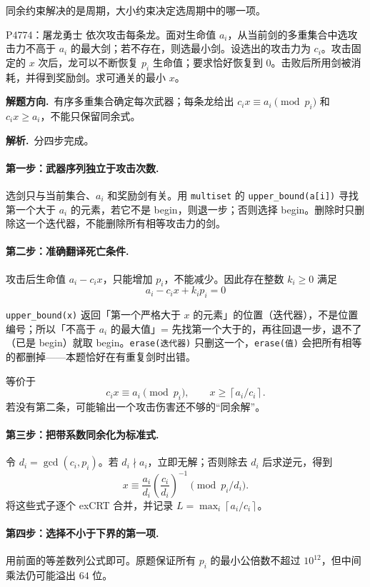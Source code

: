\documentclass[UTF8,a4paper,11pt,oneside,openany,fontset=fandol]{ctexbook}
\theoremstyle{definition}
\newcommand{\ceil}[1]{\left\lceil #1\right\rceil}
\newcommand{\sol}{\par\noindent\textbf{解析.}\ }
\newcommand{\hint}{\par\noindent\textbf{解题方向.}\ }
\begin{document}
同余约束解决的是周期，大小约束决定选周期中的哪一项。


\begin{problem}{P4774：屠龙勇士}
依次攻击每条龙。面对生命值 $a_i$，从当前剑的多重集合中选攻击力不高于 $a_i$ 的最大剑；若不存在，则选最小剑。设选出的攻击力为 $c_i$。攻击固定的 $x$ 次后，龙可以不断恢复 $p_i$ 生命值；要求恰好恢复到 $0$。击败后所用剑被消耗，并得到奖励剑。求可通关的最小 $x$。
\end{problem}
\hint 有序多重集合确定每次武器；每条龙给出 $c_ix\equiv a_i\pmod{p_i}$ 和 $c_ix\ge a_i$，不能只保留同余式。

\sol 分四步完成。
\paragraph{第一步：武器序列独立于攻击次数.}
选剑只与当前集合、$a_i$ 和奖励剑有关。用 \texttt{multiset} 的 \texttt{upper\_bound(a[i])} 寻找第一个大于 $a_i$ 的元素，若它不是 begin，则退一步；否则选择 begin。删除时只删除这一个迭代器，不能删除所有相等攻击力的剑。

\paragraph{第二步：准确翻译死亡条件.}
攻击后生命值 $a_i-c_ix$，只能增加 $p_i$，不能减少。因此存在整数 $k_i\ge0$ 满足
\[
 a_i-c_ix+k_ip_i=0
\]

\begin{tip}[两个容器术语]
\texttt{upper\_bound(x)} 返回「第一个严格大于 $x$ 的元素」的位置（迭代器），不是位置编号；所以「不高于 $a_i$ 的最大值」= 先找第一个大于的，再往回退一步，退不了（已是 begin）就取 begin。\texttt{erase(迭代器)} 只删这一个，\texttt{erase(值)} 会把所有相等的都删掉——本题恰好在有重复剑时出错。
\end{tip}

等价于
\[
 c_ix\equiv a_i\pmod{p_i},\qquad x\ge\ceil{a_i/c_i}.
\]
若没有第二条，可能输出一个攻击伤害还不够的“同余解”。

\paragraph{第三步：把带系数同余化为标准式.}
令 $d_i=\gcd(c_i,p_i)$。若 $d_i\nmid a_i$，立即无解；否则除去 $d_i$ 后求逆元，得到
\[
 x\equiv \frac{a_i}{d_i}\left(\frac{c_i}{d_i}\right)^{-1}
 \pmod{p_i/d_i}.
\]
将这些式子逐个 exCRT 合并，并记录 $L=\max_i\ceil{a_i/c_i}$。
\paragraph{第四步：选择不小于下界的第一项.}
用前面的等差数列公式即可。原题保证所有 $p_i$ 的最小公倍数不超过 $10^{12}$，但中间乘法仍可能溢出 $64$ 位。
\end{document}
